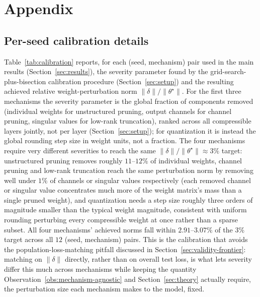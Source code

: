 \documentclass{article}
\newcommand{\theorig}{\theta^\star}
\begin{document}


\appendix
\section{Appendix}

\subsection{Per-seed calibration details}
\label{app:calibration}
Table~\ref{tab:calibration} reports, for each (seed, mechanism) pair used in the main results (Section~\ref{sec:results}), the severity parameter found by the grid-search-plus-bisection calibration procedure (Section~\ref{sec:setup}) and the resulting achieved relative weight-perturbation norm $\|\delta\|/\|\theorig\|$. For the first three mechanisms the severity parameter is the global fraction of components removed (individual weights for unstructured pruning, output channels for channel pruning, singular values for low-rank truncation), ranked across all compressible layers jointly, not per layer (Section~\ref{sec:setup}); for quantization it is instead the global rounding step size in weight units, not a fraction. The four mechanisms require very different severities to reach the same $\|\delta\|/\|\theorig\|\approx3\%$ target: unstructured pruning removes roughly $11$--$12\%$ of individual weights, channel pruning and low-rank truncation reach the same perturbation norm by removing well under $1\%$ of channels or singular values respectively (each removed channel or singular value concentrates much more of the weight matrix's mass than a single pruned weight), and quantization needs a step size roughly three orders of magnitude smaller than the typical weight magnitude, consistent with uniform rounding perturbing every compressible weight at once rather than a sparse subset. All four mechanisms' achieved norms fall within $2.91$--$3.07\%$ of the $3\%$ target across all $12$ (seed, mechanism) pairs. This is the calibration that avoids the population-loss-matching pitfall discussed in Section~\ref{sec:validity-frontier}: matching on $\|\delta\|$ directly, rather than on overall test loss, is what lets severity differ this much across mechanisms while keeping the quantity Observation~\ref{obs:mechanism-agnostic} and Section~\ref{sec:theory} actually require, the perturbation size each mechanism makes to the model, fixed.
\end{document}
